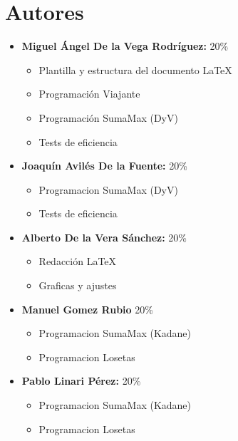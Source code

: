 \documentclass[11pt,openany]{book}
\begin{document}
\tableofcontents %
\newpage %


\chapter{Autores}
\begin{itemize}
      \item \textbf{Miguel Ángel De la Vega Rodríguez:} 20\%
            \begin{itemize}
                  \item Plantilla y estructura del documento \LaTeX
                  \item Programación Viajante
                  \item Programación SumaMax (DyV)
                  \item Tests de eficiencia
            \end{itemize}
      \item \textbf{Joaquín Avilés De la Fuente:} 20\%
            \begin{itemize}
                  \item Programacion SumaMax (DyV)
                  \item Tests de eficiencia
            \end{itemize}
      \item \textbf{Alberto De la Vera Sánchez: } 20\%
            \begin{itemize}
                  \item Redacción \LaTeX
                  \item Graficas y ajustes
            \end{itemize}
      \item \textbf{Manuel Gomez Rubio} 20\%
            \begin{itemize}
                  \item Programacion SumaMax (Kadane)
                  \item Programacion Losetas
            \end{itemize}
      \item \textbf{Pablo Linari Pérez:} 20\%
            \begin{itemize}
                  \item Programacion SumaMax (Kadane)
                  \item Programacion Losetas
            \end{itemize}
\end{itemize}
\end{document}
